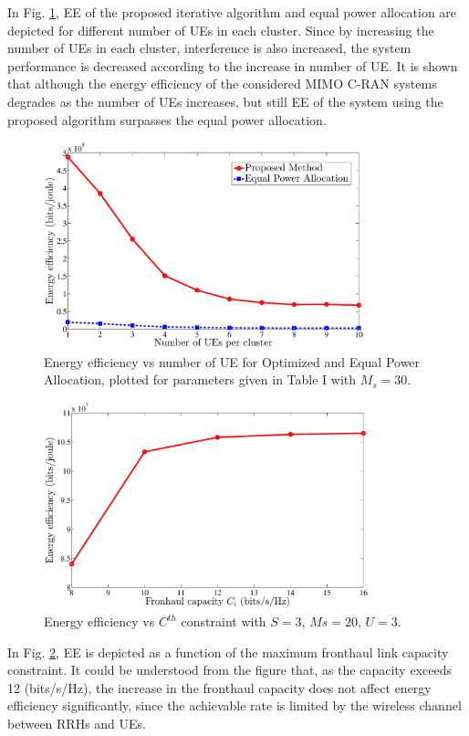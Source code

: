 \documentclass[journal,onecolumn,11pt,draftcls,doublespace]{IEEEtran}
\begin{document}
In Fig. \ref{fig:nem2}, EE of the proposed iterative algorithm and equal power allocation are depicted for different number of UEs in each cluster. Since by increasing the number of UEs in each cluster, interference is also increased, the system performance is decreased according to the increase in number of UE. It is shown that although the energy efficiency of the considered MIMO C-RAN systems degrades as the number of UEs increases, but still EE of the system using the proposed algorithm surpasses the equal power allocation.
  
  \begin{figure}
  \centering
    \includegraphics[width=0.5\linewidth, height=6cm]{ue}
  \caption{Energy efficiency vs number of UE for Optimized and Equal Power Allocation, plotted for parameters given in Table I with $M_s=30$.}
  \label{fig:nem2}
\end{figure}
%
%
\begin{figure}
  \centering
    \includegraphics[width=0.5\linewidth, height=6cm]{c}
  \caption{Energy efficiency vs ${C}^{th} $ constraint with $S =3$, $Ms= 20$, $U =3$. }
  \label{fig:nem3}
\end{figure}


In Fig. \ref{fig:nem3}, EE is depicted as a function of the maximum fronthaul link capacity constraint. It could be understood from the figure that, as the capacity exceeds 12 (bits/s/Hz), the increase in the fronthaul capacity does not affect energy efficiency significantly, since the achievable rate is limited by the wireless channel between RRHs and UEs.
\end{document}
